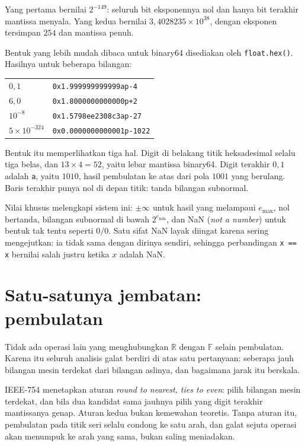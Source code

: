 Yang pertama bernilai $2^{-149}$: seluruh bit eksponennya nol dan hanya bit terakhir
mantissa menyala. Yang kedua bernilai $3{,}4028235\times10^{38}$, dengan eksponen
tersimpan $254$ dan mantissa penuh.

Bentuk yang lebih mudah dibaca untuk binary64 disediakan oleh \texttt{float.hex()}. Hasilnya untuk beberapa bilangan:

\begin{center}
\begin{tabular}{ll}
\hline
$0{,}1$ & \texttt{0x1.999999999999ap-4} \\
$6{,}0$ & \texttt{0x1.8000000000000p+2} \\
$10^{-8}$ & \texttt{0x1.5798ee2308c3ap-27} \\
$5\times10^{-324}$ & \texttt{0x0.0000000000001p-1022} \\
\hline
\end{tabular}
\end{center}

Bentuk itu memperlihatkan tiga hal. Digit di belakang titik heksadesimal selalu tiga
belas, dan $13\times4=52$, yaitu lebar mantissa binary64. Digit terakhir $0{,}1$
adalah \texttt{a}, yaitu $1010$, hasil pembulatan ke atas dari pola $1001$ yang
berulang. Baris terakhir punya nol di depan titik: tanda bilangan subnormal.

Nilai khusus melengkapi sistem ini: $\pm\infty$ untuk hasil yang melampaui
$e_{\max}$, nol bertanda, bilangan subnormal di bawah $2^{e_{\min}}$, dan NaN
(\emph{not a number}) untuk bentuk tak tentu seperti $0/0$. Satu sifat NaN layak
diingat karena sering mengejutkan: ia tidak sama dengan dirinya sendiri, sehingga
perbandingan \texttt{x == x} bernilai salah justru ketika $x$ adalah NaN.

\section{Satu-satunya jembatan: pembulatan}

Tidak ada operasi lain yang menghubungkan $\mathbb{R}$ dengan $\mathbb{F}$ selain
pembulatan. Karena itu seluruh analisis galat berdiri di atas satu pertanyaan: seberapa
jauh bilangan mesin terdekat dari bilangan aslinya, dan bagaimana jarak itu berskala.

IEEE-754 menetapkan aturan \emph{round to nearest, ties to even}: pilih bilangan mesin
terdekat, dan bila dua kandidat sama jauhnya pilih yang digit terakhir mantissanya
genap. Aturan kedua bukan kemewahan teoretis. Tanpa aturan itu, pembulatan pada titik
seri selalu condong ke satu arah, dan galat sejuta operasi akan menumpuk ke arah yang
sama, bukan saling meniadakan.

